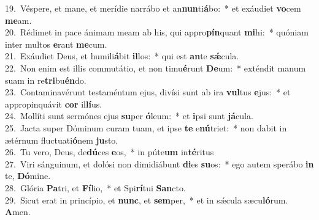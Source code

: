 {19.~}Véspere, et mane, et merídie narrábo et an\textbf{nun}ti\textbf{á}bo:~* et exáudiet \textbf{vo}cem \textbf{me}am.\\
{20.~}Rédimet in pace ánimam meam ab his, qui appro\textbf{pín}quant \textbf{mi}hi:~* quóniam inter multos \textbf{e}rant \textbf{me}cum.\\
{21.~}Exáudiet Deus, et humili\textbf{á}bit \textbf{il}los:~* qui est \textbf{an}te \textbf{sǽ}cula.\\
{22.~}Non enim est illis commutátio, et non timu\textbf{é}runt \textbf{De}um:~* exténdit manum suam in re\textbf{tri}bu\textbf{én}do.\\
{23.~}Contaminavérunt testaméntum ejus, divísi sunt ab ira \textbf{vul}tus \textbf{e}jus:~* et appropinquávit \textbf{cor} il\textbf{lí}us.\\
{24.~}Mollíti sunt sermónes ejus \textbf{su}per \textbf{ó}leum:~* et \textbf{i}psi sunt \textbf{já}cula.\\
{25.~}Jacta super Dóminum curam tuam, et ipse \textbf{te} e\textbf{nú}triet:~* non dabit in ætérnum fluctuati\textbf{ó}nem \textbf{ju}sto.\\
{26.~}Tu vero, Deus, de\textbf{dú}ces \textbf{e}os,~* in púte\textbf{um} in\textbf{té}ritus\\
{27.~}Viri sánguinum, et dolósi non dimidiábunt \textbf{di}es \textbf{su}os:~* ego autem sperábo \textbf{in} te, \textbf{Dó}mine.\\
{28.~}Glória \textbf{Pa}tri, et \textbf{Fí}lio,~* et Spi\textbf{rí}tui \textbf{San}cto.\\
{29.~}Sicut erat in princípio, et \textbf{nunc}, et \textbf{sem}per,~* et in sǽcula sæcu\textbf{ló}rum. \textbf{A}men.\\
